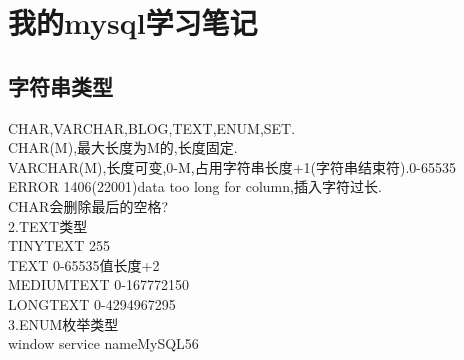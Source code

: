 \chapter{我的mysql学习笔记}
\section{字符串类型}
CHAR,VARCHAR,BLOG,TEXT,ENUM,SET.\\
CHAR(M),最大长度为M的,长度固定.\\
VARCHAR(M),长度可变,0-M,占用字符串长度+1(字符串结束符).0-65535\\
ERROR 1406(22001)data too long for column,插入字符过长.\\
CHAR会删除最后的空格?\\
2.TEXT类型\\
TINYTEXT 255\\
TEXT 0-65535值长度+2\\
MEDIUMTEXT 0-167772150\\
LONGTEXT 0-4294967295\\
3.ENUM枚举类型\\
window service nameMySQL56